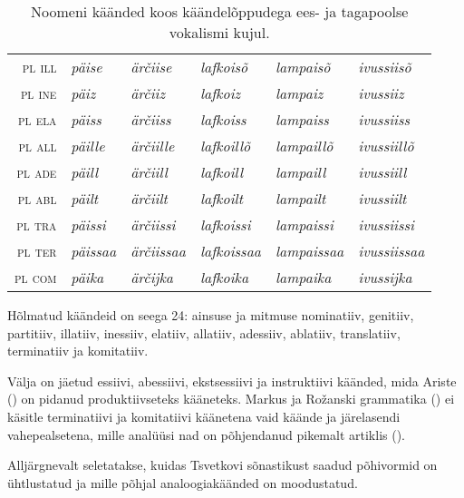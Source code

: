 \documentclass[12pt,a4paper]{article}
\newcommand{\vadja}[1]{\textit{#1}}
\newcommand{\msd}[1]{\textsc{#1}}
\begin{document}
\begin{table}[ht]
\begin{tabular}[t]{r l l l l l}
    \msd{pl ill} & \vadja{päise  } & \vadja{ärčiise  } & \vadja{lafkoisõ  } & \vadja{lampaisõ  } & \vadja{ivussiisõ} \\
    \msd{pl ine} & \vadja{päiz   } & \vadja{ärčiiz   } & \vadja{lafkoiz   } & \vadja{lampaiz   } & \vadja{ivussiiz} \\
    \msd{pl ela} & \vadja{päiss  } & \vadja{ärčiiss  } & \vadja{lafkoiss  } & \vadja{lampaiss  } & \vadja{ivussiiss} \\
    \msd{pl all} & \vadja{päille } & \vadja{ärčiille } & \vadja{lafkoillõ } & \vadja{lampaillõ } & \vadja{ivussiillõ} \\
    \msd{pl ade} & \vadja{päill  } & \vadja{ärčiill  } & \vadja{lafkoill  } & \vadja{lampaill  } & \vadja{ivussiill} \\
    \msd{pl abl} & \vadja{päilt  } & \vadja{ärčiilt  } & \vadja{lafkoilt  } & \vadja{lampailt  } & \vadja{ivussiilt} \\
    \msd{pl tra} & \vadja{päissi } & \vadja{ärčiissi } & \vadja{lafkoissi } & \vadja{lampaissi } & \vadja{ivussiissi} \\
    \msd{pl ter} & \vadja{päissaa} & \vadja{ärčiissaa} & \vadja{lafkoissaa} & \vadja{lampaissaa} & \vadja{ivussiissaa} \\
    \msd{pl com} & \vadja{päika  } & \vadja{ärčijka  } & \vadja{lafkoika  } & \vadja{lampaika  } & \vadja{ivussijka} \\
  \end{tabular}
  \caption{Noomeni käänded koos käändelõppudega ees- ja tagapoolse vokalismi kujul.}
  \label{tab:noomeni-käänded}
\end{table}

Hõlmatud käändeid on seega 24: ainsuse ja mitmuse nominatiiv, genitiiv, partitiiv, illatiiv, inessiiv, elatiiv, allatiiv, adessiiv, ablatiiv, translatiiv, terminatiiv ja komitatiiv.

Välja on jäetud essiivi, abessiivi, ekstsessiivi ja instruktiivi käänded, mida Ariste (\citeyear[17]{ariste_grammar_1968}) on pidanud produktiivseteks kääneteks. Markus ja Rožanski grammatika (\citeyear{__2011}) ei käsitle terminatiivi ja komitatiivi käänetena vaid käände ja järelasendi vahe\-pealsetena, mille analüüsi nad on põhjendanud pikemalt artiklis (\cite{markus_comitative_2014}).

Alljärgnevalt seletatakse, kuidas Tsvetkovi sõnastikust saadud põhi\-vormid on ühtlustatud ja mille põhjal analoogia\-käänded on moodustatud.
\end{document}
